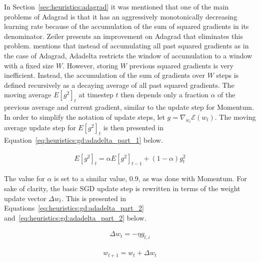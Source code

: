 In Section~\ref{sec:heuristics:adagrad} it was mentioned that one of the main problems of \ac{Adagrad} is that it has an aggressively monotonically decreasing learning rate because of the accumulation of the sum of squared gradients in its denominator. Zeiler \cite{ref:zeiler:2012} presents an improvement on \ac{Adagrad} that eliminates this problem. \citeauthor{ref:ruder:2016} \cite{ref:ruder:2016} mentions that instead of accumulating all past squared gradients as in the case of \ac{Adagrad}, \ac{Adadelta} restricts the window of accumulation to a window with a fixed size $W$. However, storing $W$ previous squared gradients is very inefficient. Instead, the accumulation of the sum of gradients over $W$ steps is defined recursively as a decaying average of all past squared gradients. The moving average $E[g^{2}]_{t}$ at timestep $t$ then depends only a fraction $\alpha$ of the previous average and current gradient, similar to the update step for \ac{Momentum}. In order to simplify the notation of update steps, let $g = \nabla_{w_{i}}\mathcal{E}(w_{t})$. The moving average update step for $E[g^{2}]_{t}$ is then presented in Equation~\ref{eq:heuristics:gd:adadelta_part_1} below.

\begin{equation}
      \label{eq:heuristics:gd:adadelta_part_1}
      \begin{split}
            E[g^{2}]_{t} = \alpha E[g^{2}]_{t - 1} + (1 - \alpha)g_{t}^{2}
      \end{split}
\end{equation}

The value for $\alpha$ is set to a similar value, 0.9, as was done with \ac{Momentum}. For sake of clarity, the basic \ac{SGD} update step is rewritten in terms of the weight update vector $\Delta w_{t}$. This is presented in Equations~\ref{eq:heuristics:gd:adadelta_part_2} and~\ref{eq:heuristics:gd:adadelta_part_2} below.

\begin{equation}
      \label{eq:heuristics:gd:adadelta_part_2}
      \begin{split}
            \Delta w_{t} = -\eta g_{t,i}
      \end{split}
\end{equation}

\begin{equation}
      \label{eq:heuristics:gd:adadelta_part_3}
      \begin{split}
            w_{t+1} = w_{t} + \Delta w_{t}
      \end{split}
\end{equation}

